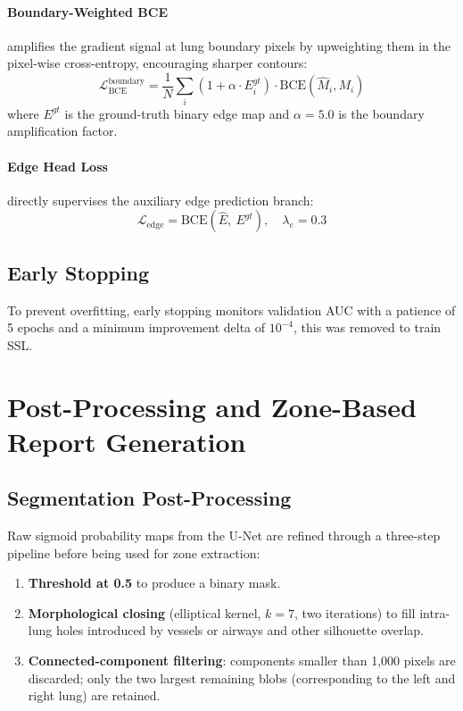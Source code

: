 \paragraph{Boundary-Weighted BCE} amplifies the gradient signal at lung boundary pixels by upweighting them in the pixel-wise cross-entropy, encouraging sharper contours:
\begin{equation}
\mathcal{L}_{\text{BCE}}^{\text{boundary}} = \frac{1}{N}\sum_i (1 + \alpha \cdot E_i^{gt}) \cdot \text{BCE}(\hat{M}_i, M_i)
\end{equation}
where $E^{gt}$ is the ground-truth binary edge map and $\alpha = 5.0$ is the boundary amplification factor.

\paragraph{Edge Head Loss} directly supervises the auxiliary edge prediction branch:
\begin{equation}
\mathcal{L}_{\text{edge}} = \text{BCE}(\hat{E},\ E^{gt}), \quad \lambda_e = 0.3
\end{equation}

\subsection{Early Stopping}

To prevent overfitting, early stopping monitors validation AUC with a patience of 5 epochs and a minimum improvement delta of $10^{-4}$, this was removed to train SSL.

\section{Post-Processing and Zone-Based Report Generation}

\subsection{Segmentation Post-Processing}

Raw sigmoid probability maps from the U-Net are refined through a three-step pipeline before being used for zone extraction:

\begin{enumerate}
    \item \textbf{Threshold at 0.5} to produce a binary mask.
    \item \textbf{Morphological closing} (elliptical kernel, $k=7$, two iterations) to fill intra-lung holes introduced by vessels or airways and other silhouette overlap.
    \item \textbf{Connected-component filtering}: components smaller than 1,000 pixels are discarded; only the two largest remaining blobs (corresponding to the left and right lung) are retained.
\end{enumerate}

